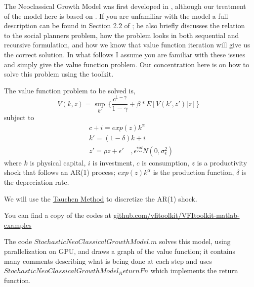 %
 
The Neoclassical Growth Model was first developed in \cite{BrockMirman1972}, although our treatment of the model here is based
on \cite{DiazGimenez2001}. If you are unfamiliar with the model a full description can be found in Section 2.2 of 
\cite{DiazGimenez2001}; he also briefly discusses the relation to the social planners problem, how the problem looks in both sequential and 
recursive formulation, and how we know that value function iteration will give us the correct solution. In what follows I assume you
are familiar with these issues and simply give the value function problem. Our concentration here is on how to solve this problem 
using the toolkit.

The value function problem to be solved is,
\begin{equation*}
 V(k,z)=\sup_{k'} \, \{ \frac{c^{1-\gamma}}{1-\gamma}+\beta*E[V(k',z')|z] \}
\end{equation*}
subject to
\begin{eqnarray}
 & c+i=exp(z) k^{\alpha} \\
 & k'=(1-\delta)k+i \\
 & z'=\rho z +\epsilon' \quad ,\epsilon \overset{iid}{\sim} N(0,\sigma_{\epsilon}^2)
\end{eqnarray}
where $k$ is physical capital, $i$ is investment, $c$ is consumption, $z$ is a productivity shock that follows an AR(1) process; 
$exp(z) k^{\alpha}$ is the production function, $\delta$ is the depreciation rate.

We will use the \href{appendix:TauchenMethod}{Tauchen Method} to discretize the AR(1) shock.

You can find a copy of the codes at \href{https://github.com/vfitoolkit/VFItoolkit-matlab-examples}{github.com/vfitoolkit/VFItoolkit-matlab-examples}

The code $StochasticNeoClassicalGrowthModel.m$ solves this model, using parallelization on GPU, and draws a graph of the value function; it contains many comments describing what is being done
at each step and uses $StochasticNeoClassicalGrowthModel_ReturnFn$ which implements the return function.
% 
% 
% 
% 
% 

%